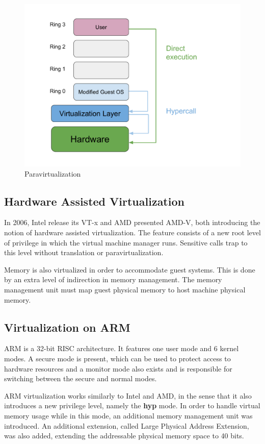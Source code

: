 \begin{figure}[h!]
\centering
  \includegraphics[width=.55\linewidth]{img/paravirt.pdf}
  \caption{Paravirtualization}
\end{figure}

\subsection{Hardware Assisted Virtualization}
\label{subsec:havirt}

In 2006, Intel release its VT-x and AMD presented AMD-V, both introducing the notion of hardware assisted virtualization. The feature consists of a new root level of privilege in which the virtual machine manager runs. Sensitive calls trap to this level without  translation or paravirtualization\cite{vmware}.

Memory is also virtualized in order to accommodate guest systems. This is done by an extra level of indirection in memory management. The memory management unit must map guest physical memory to host machine physical memory\cite{genode-arm}.

\subsection{Virtualization on ARM}
\label{subsec:armvirt}

ARM is a 32-bit RISC architecture. It features one user mode and 6 kernel modes. A secure mode is present, which can be used to protect access to hardware resources and a monitor mode also exists and is responsible for switching between the secure and normal modes\cite{hw-support-arm}.

ARM virtualization works similarly to Intel and AMD, in the sense that it also introduces a new privilege level, namely the \textbf{hyp} mode. In order to handle virtual memory usage while in this mode, an additional memory management unit was introduced. An additional extension, called Large Physical Address Extension, was also added, extending the addressable physical memory space to 40 bits\cite{genode-arm}.

